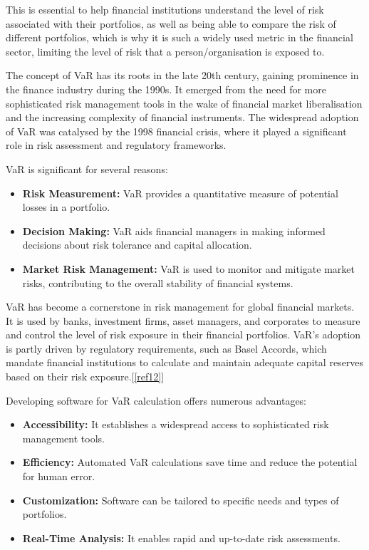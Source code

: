\documentclass{article}
\begin{document}
This is essential to help financial institutions understand the level of risk associated with their portfolios, as well as being able to compare the risk of different portfolios, which is why it is such a widely used metric in the financial sector, limiting the level of risk that a person/organisation is exposed to.\\\vspace{0.3cm}

The concept of VaR has its roots in the late 20th century, gaining prominence in the finance industry during the 1990s. It emerged from the need for more sophisticated risk management tools in the wake of financial market liberalisation and the increasing complexity of financial instruments. The widespread adoption of VaR was catalysed by the 1998 financial crisis, where it played a significant role in risk assessment and regulatory frameworks.\\\vspace{0.3cm}


VaR is significant for several reasons:
\begin{itemize}
    \item \textbf{Risk Measurement:} VaR provides a quantitative measure of potential losses in a portfolio.
    \item \textbf{Decision Making:} VaR aids financial managers in making informed decisions about risk tolerance and capital allocation.
    \item \textbf{Market Risk Management:} VaR is used to monitor and mitigate market risks, contributing to the overall stability of financial systems.
\end{itemize}

VaR has become a cornerstone in risk management for global financial markets. It is used by banks, investment firms, asset managers, and corporates to measure and control the level of risk exposure in their financial portfolios. VaR's adoption is partly driven by regulatory requirements, such as Basel Accords, which mandate financial institutions to calculate and maintain adequate capital reserves based on their risk exposure.[\ref{ref12}]\\\vspace{0.3cm} 


Developing software for VaR calculation offers numerous advantages:
\begin{itemize}
    \item \textbf{Accessibility:} It establishes a widespread access to sophisticated risk management tools.
    \item \textbf{Efficiency:} Automated VaR calculations save time and reduce the potential for human error.
    \item \textbf{Customization:} Software can be tailored to specific needs and types of portfolios.
    \item \textbf{Real-Time Analysis:} It enables rapid and up-to-date risk assessments.
\end{itemize}
\end{document}
